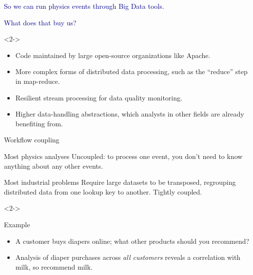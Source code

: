 \documentclass{beamer}
\begin{document}
\begin{frame}{}
\vfill
\textcolor{darkblue}{\Large So we can run physics events through Big Data \mbox{tools.\hspace{-1 cm}}}

\vspace{0.3 cm}
\textcolor{darkblue}{\Large What does that buy us?}

\begin{uncoverenv}<2->
\begin{itemize}\setlength{\itemsep}{0.2 cm}
\item Code maintained by large open-source organizations like Apache.
\item More complex forms of distributed data processing, such as the ``reduce'' step in map-reduce.
\item Resilient stream processing for data quality monitoring.
\item Higher data-handling abstractions, which analysts in other fields are already benefiting from.
\end{itemize}
\end{uncoverenv}
\end{frame}

\begin{frame}{Workflow coupling}

\begin{block}{Most physics analyses}
Uncoupled: to process one event, you don't need to know anything about any other events.
\end{block}

\begin{block}{Most industrial problems}
Require large datasets to be transposed, regrouping distributed data from one lookup key to another. Tightly coupled.
\end{block}

\begin{uncoverenv}<2->
\begin{block}{Example}
\begin{itemize}
\item A customer buys diapers online; what other products should you recommend?
\item Analysis of diaper purchases across {\it all customers} reveals a correlation with milk, so recommend milk.
\end{itemize}
\end{block}
\end{uncoverenv}
\end{frame}
\end{document}
